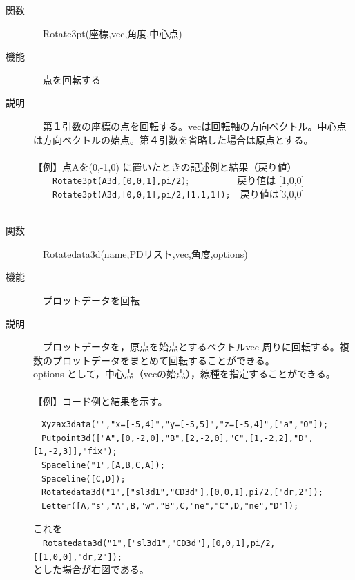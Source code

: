 \documentclass[papersize,a4paper,12pt,uplatex]{jsarticle}
\begin{document}
\begin{description}
\hypertarget{rotate3pt}{}
\item[関数]　Rotate3pt(座標,vec,角度,中心点)
\item[機能]　点を回転する
\item[説明]　第１引数の座標の点を回転する。vecは回転軸の方向ベクトル。中心点は方向ベクトルの始点。第４引数を省略した場合は原点とする。\\
　\\
【例】点Aを(0,-1,0) に置いたときの記述例と結果（戻り値）\\
　　\verb|Rotate3pt(A3d,[0,0,1],pi/2)|;　　　　　戻り値は [1,0,0]\\
　　\verb|Rotate3pt(A3d,[0,0,1],pi/2,[1,1,1]);|　戻り値は[3,0,0]\\
　\\

\hypertarget{rotatedata3d}{}
\item[関数]　Rotatedata3d(name,PDリスト,vec,角度,options)
\item[機能]　プロットデータを回転
\item[説明]　プロットデータを，原点を始点とするベクトルvec 周りに回転する。複数のプロットデータをまとめて回転することができる。\\
options として，中心点（vecの始点），線種を指定することができる。\\
　\\
【例】コード例と結果を示す。
\begin{verbatim}
　Xyzax3data("","x=[-5,4]","y=[-5,5]","z=[-5,4]",["a","O"]);
　Putpoint3d(["A",[0,-2,0],"B",[2,-2,0],"C",[1,-2,2],"D",[1,-2,3]],"fix");
　Spaceline("1",[A,B,C,A]);
　Spaceline([C,D]);
　Rotatedata3d("1",["sl3d1","CD3d"],[0,0,1],pi/2,["dr,2"]);
　Letter([A,"s","A",B,"w","B",C,"ne","C",D,"ne","D"]);
\end{verbatim}
これを\\
　\verb|Rotatedata3d("1",["sl3d1","CD3d"],[0,0,1],pi/2,[[1,0,0],"dr,2"]);|\\
とした場合が右図である。\\

　　\\


\end{description}
\end{document}
